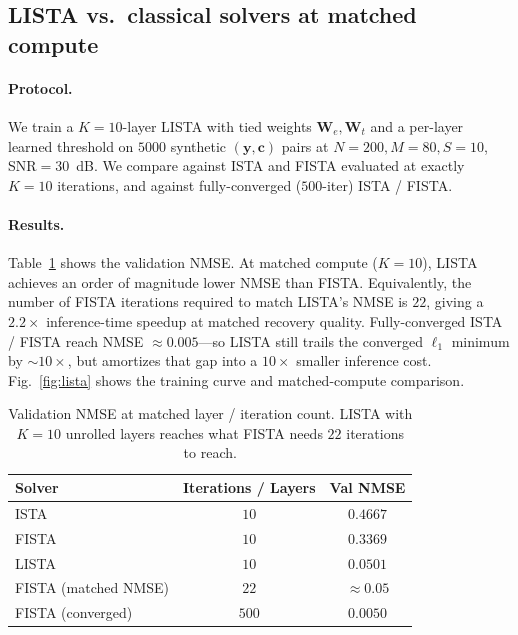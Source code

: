 \documentclass{article}
\begin{document}
\subsection{LISTA vs.\ classical solvers at matched compute}

\paragraph{Protocol.} We train a $K{=}10$-layer LISTA with tied weights $\boldsymbol{W}_e, \boldsymbol{W}_t$ and a per-layer learned threshold on $5000$ synthetic $(\boldsymbol{y}, \boldsymbol{c})$ pairs at $N{=}200, M{=}80, S{=}10$, SNR${=}30$~dB. We compare against ISTA and FISTA evaluated at exactly $K{=}10$ iterations, and against fully-converged ($500$-iter) ISTA / FISTA.

\paragraph{Results.} Table~\ref{tab:lista} shows the validation NMSE. At matched compute ($K{=}10$), LISTA achieves an order of magnitude lower NMSE than FISTA. Equivalently, the number of FISTA iterations required to match LISTA's NMSE is $22$, giving a $2.2\times$ inference-time speedup at matched recovery quality. Fully-converged ISTA / FISTA reach NMSE $\approx 0.005$---so LISTA still trails the converged $\ell_1$ minimum by $\sim 10\times$, but amortizes that gap into a $10\times$ smaller inference cost. Fig.~\ref{fig:lista} shows the training curve and matched-compute comparison.

\begin{table}[t]
  \caption{Validation NMSE at matched layer / iteration count. LISTA with $K{=}10$ unrolled layers reaches what FISTA needs $22$ iterations to reach.}
  \label{tab:lista}
  \centering
  \begin{tabular}{lcc}
    \toprule
    Solver & Iterations / Layers & Val NMSE \\
    \midrule
    ISTA   & $10$  & $0.4667$ \\
    FISTA  & $10$  & $0.3369$ \\
    LISTA  & $10$  & $\mathbf{0.0501}$ \\
    \midrule
    FISTA (matched NMSE) & $22$ & $\approx 0.05$ \\
    FISTA (converged)    & $500$ & $0.0050$ \\
    \bottomrule
  \end{tabular}
\end{table}
\end{document}
